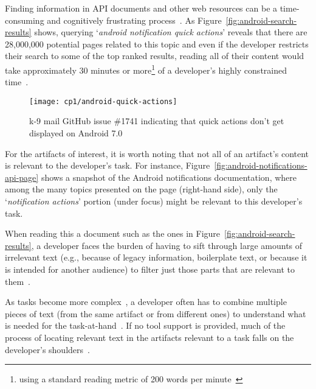 



Finding information in API documents and other web resources can be a time-consuming
and cognitively frustrating process~\cite{Begel2008,
robillard2011field}. 
As Figure~\ref{fig:android-search-results} shows, querying `\textit{android notification quick actions}'
reveals that there are 28,000,000 potential pages related to this topic
and even if the developer restricts their search to some of the top ranked results, reading all of their content would take approximately 30 minutes or more\footnote{using a standard reading metric of 200 words per minute~\cite{Just1980}} of a developer's highly constrained time~\cite{endrikat2014, Meyer2017}. 


\begin{figure}
    \centering
    \texttt{[image: cp1/android-quick-actions]}
    \caption{k-9 mail GitHub issue \#1741 indicating that quick actions don't get displayed on Android 7.0}
    \label{fig:android-notifications-task}
\end{figure}



For the artifacts of interest, it is worth noting that not all of an artifact's content is relevant to the developer's task. 
For instance, Figure~\ref{fig:android-notifications-api-page} shows a snapshot 
of the Android notifications documentation, where among  
the many topics presented on the page (right-hand side), only the `\textit{notification actions}' portion (under focus) might be relevant to this developer's task. 


When reading this a document such as the ones in Figure~\ref{fig:android-search-results}, a developer 
faces the burden of having to sift through large amounts of
irrelevant text (e.g., because of legacy information, boilerplate text, or because it is intended for another audience) to filter just those parts that are relevant to them~\cite{Robillard2015}. 



As tasks become more complex~\cite{Pirolli2007, Bystrom1995}, a developer often has to combine multiple pieces of text (from the same artifact or from different ones) to understand what is needed for the task-at-hand~\cite{Piorkowski2016}. 
If no tool support is provided, much of the process of locating relevant text in the 
artifacts relevant to a task falls on the developer's shoulders~\cite{gonccalves2011, Ko2006a, Bystrom1995}.


